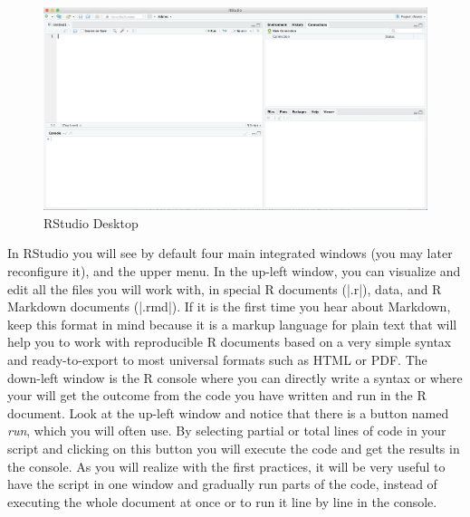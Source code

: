 \begin{figure}
\centering
\includegraphics[width=0.9\linewidth]{figures/ch3_r_studio}
\caption{RStudio Desktop}
\label{fig:r_studio}
\end{figure}

In RStudio you will see by default four main integrated windows (you
may later reconfigure it), and the upper menu. In the up-left window,
you can visualize and edit all the files you will work with, in
special R documents (|.r|), data, and R Markdown documents (|.rmd|).
If it is the first time you hear about Markdown, keep this format in
mind because it is a markup language for plain text that will help you
to work with reproducible R documents based on a very simple syntax
and ready-to-export to most universal formats such as HTML or PDF. The
down-left window is the R console where you can directly write a
syntax or where your will get the outcome from the code you have
written and run in the R document. Look at the up-left window
and notice that there is a button named \emph{run}, which you will
often use. By selecting partial or total lines of code in your script
and clicking on this button you will execute the code and get the
results in the console.  As you will realize with the first practices,
it will be very useful to have the script in one window and gradually
run parts of the code, instead of executing the whole document at once
or to run it line by line in the console.

